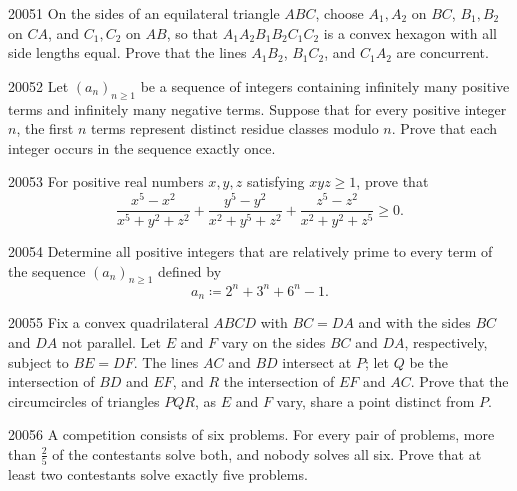 
\begin{problem}{2005}{1}
On the sides of an equilateral triangle $ABC$, choose $A_1, A_2$ on $BC$, $B_1, B_2$ on $CA$, and $C_1, C_2$ on $AB$, so that $A_1A_2B_1B_2C_1C_2$ is a convex hexagon with all side lengths equal. Prove that the lines $A_1B_2$, $B_1C_2$, and $C_1A_2$ are concurrent.
\end{problem}

\begin{problem}{2005}{2}
Let $(a_n)_{n\geq1}$ be a sequence of integers containing infinitely many positive terms and infinitely many negative terms. Suppose that for every positive integer $n$, the first $n$ terms represent distinct residue classes modulo $n$. Prove that each integer occurs in the sequence exactly once.
\end{problem}

\begin{problem}{2005}{3}
For positive real numbers $x, y, z$ satisfying $xyz\geq1$, prove that
\[
    \frac{x^5-x^2}{x^5+y^2+z^2}+\frac{y^5-y^2}{x^2+y^5+z^2}
    +\frac{z^5-z^2}{x^2+y^2+z^5}\geq0.
\]
\end{problem}

\begin{problem}{2005}{4}
Determine all positive integers that are relatively prime to every term of the sequence $(a_n)_{n\geq1}$ defined by
\[
    a_n\coloneqq2^n+3^n+6^n-1.
\]
\end{problem}

\begin{problem}{2005}{5}
Fix a convex quadrilateral $ABCD$ with $BC=DA$ and with the sides $BC$ and $DA$ not parallel. Let $E$ and $F$ vary on the sides $BC$ and $DA$, respectively, subject to $BE=DF$. The lines $AC$ and $BD$ intersect at $P$; let $Q$ be the intersection of $BD$ and $EF$, and $R$ the intersection of $EF$ and $AC$. Prove that the circumcircles of triangles $PQR$, as $E$ and $F$ vary, share a point distinct from $P$.
\end{problem}

\begin{problem}{2005}{6}
A competition consists of six problems. For every pair of problems, more than $\frac25$ of the contestants solve both, and nobody solves all six. Prove that at least two contestants solve exactly five problems.
\end{problem}
